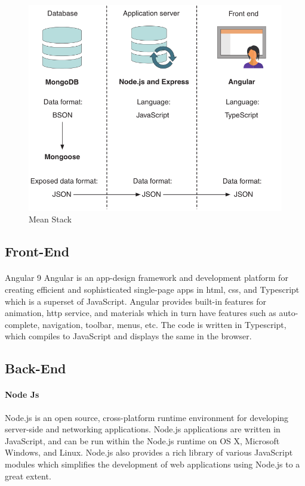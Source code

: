 \begin{figure}[!ht]
      \center
      \includegraphics[scale=0.60]{assets/mean.png}
      \caption{Mean Stack}
      \label{fig:mean}
\end{figure}
\subsection{Front-End}
\paragraph{}{Angular 9}
Angular is an app-design framework and development platform for creating efficient and sophisticated single-page apps in html, css, and Typescript which is a superset of JavaScript. Angular provides built-in features for animation, http service, and materials which in turn have features such as auto-complete, navigation, toolbar, menus, etc. The code is written in Typescript, which compiles to JavaScript and displays the same in the browser.

\subsection{Back-End}
\paragraph{Node Js}
Node.js is an open source, cross-platform runtime environment for developing server-side and networking applications. Node.js applications are written in JavaScript, and can be run within the Node.js runtime on OS X, Microsoft Windows, and Linux.
Node.js also provides a rich library of various JavaScript modules which simplifies the development of web applications using Node.js to a great extent.

